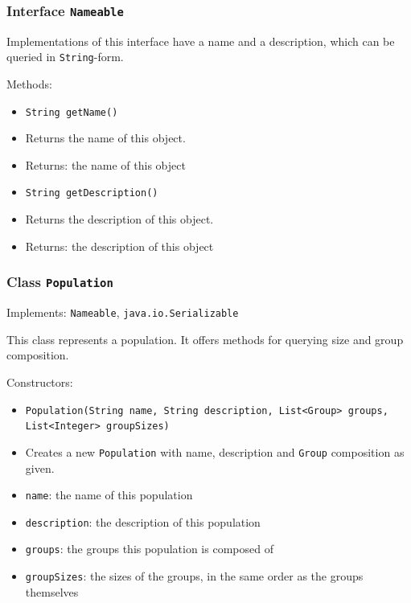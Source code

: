 \documentclass[parskip=full,11pt]{scrartcl}
\begin{document}
\subsubsection{Interface \texttt{Nameable}}

Implementations of this interface have a name and a description, which can be queried in \texttt {String}-form.

Methods:
\begin{itemize}\itemsep -10pt
\item \texttt{String getName()}
\item[] Returns the name of this object.
\item[] Returns: the name of this object

\item \texttt{String getDescription()}
\item[] Returns the description of this object.
\item[] Returns: the description of this object
\end{itemize}

\subsubsection{Class \texttt{Population}}
Implements: \texttt{Nameable}, \texttt{java.io.Serializable}

This class represents a population. It offers methods for querying size and group composition.

Constructors:
\begin{itemize}\itemsep -10pt
\item \texttt{Population(String name, String description, List<Group> groups, List<Integer> groupSizes)}
\item[] Creates a new \texttt{Population} with name, description and \texttt{Group} composition as given.
\item[] \texttt{name}: the name of this population
\item[] \texttt{description}: the description of this population
\item[] \texttt{groups}: the groups this population is composed of
\item[] \texttt{groupSizes}: the sizes of the groups, in the same order as the groups themselves
\end{itemize}
\end{document}
